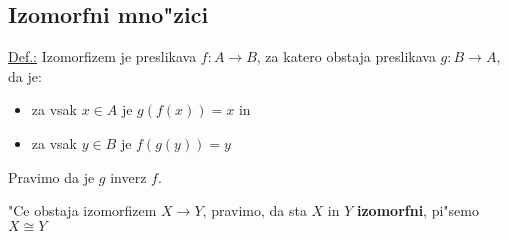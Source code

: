 \subsection{Izomorfni mno"zici}
\underline{Def.:} Izomorfizem je preslikava \(f: A \rightarrow B\), za katero obstaja preslikava \(g: B \rightarrow A\), da je:
\begin{itemize}
	\item za vsak \(x \in A\) je \(g(f(x)) = x\) in
	\item za vsak \(y \in B\) je \(f(g(y)) = y\)
\end{itemize}

Pravimo da je \(g\) inverz \(f\).

"Ce obstaja izomorfizem \(X \rightarrow Y\), pravimo, da sta \(X\) in \(Y\) \textbf{izomorfni}, pi"semo \(X \cong Y\)
